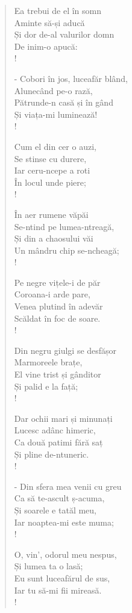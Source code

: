 \documentclass{article}
\begin{document}
\begin{small}
\begin{multicols}{3}
\begin{verse}
Ea trebui de el în somn \\
Aminte să-și aducă \\
Și dor de-al valurilor domn \\
De inim-o apucă: \\!

- Cobori în jos, luceafăr blând, \\
Alunecând pe-o rază, \\
Pătrunde-n casă și în gând \\
Și viața-mi luminează! \\!

Cum el din cer o auzi, \\
Se stinse cu durere, \\
Iar ceru-ncepe a roti \\
În locul unde piere; \\!

În aer rumene văpăi \\
Se-ntind pe lumea-ntreagă, \\
Și din a chaosului văi \\
Un mândru chip se-ncheagă; \\!

Pe negre vițele-i de păr \\
Coroana-i arde pare, \\
Venea plutind în adevăr \\
Scăldat în foc de soare. \\!

Din negru giulgi se desfășor \\
Marmoreele brațe, \\
El vine trist și gânditor \\
Și palid e la față; \\!

Dar ochii mari și minunați \\
Lucesc adânc himeric, \\
Ca două patimi fără saț \\
Și pline de-ntuneric. \\!

- Din sfera mea venii cu greu \\
Ca să te-ascult ș-acuma, \\
Și soarele e tatăl meu, \\
Iar noaptea-mi este muma; \\!

O, vin', odorul meu nespus, \\
Și lumea ta o lasă; \\
Eu sunt luceafărul de sus, \\
Iar tu să-mi fii mireasă. \\!


\end{verse}
\end{multicols}
\end{small}
\end{document}
